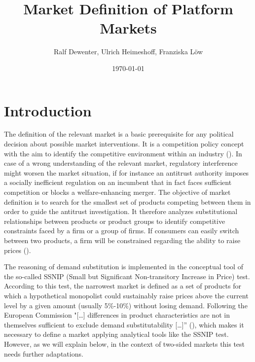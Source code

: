 \documentclass[12pt,a4paper]{scrreprt}
\begin{document}
\title{Market Definition of Platform Markets}
\date{\today}
\author{Ralf Dewenter, Ulrich Heimeshoff, Franziska Löw}

\maketitle






\chapter{Introduction}
The definition of the relevant market is a basic prerequisite for any political decision about possible market interventions. It is a competition policy concept with the aim to identify the competitive environment within an industry (\cite{argentesi_market_2005}). In case of a wrong understanding of the relevant market, regulatory interference might worsen the market situation, if for instance an antitrust authority imposes a socially inefficient regulation on an incumbent that in fact faces sufficient competition or blocks a welfare-enhancing merger. The objective of market definition is to search for the smallest set of products competing between them in order to guide the antitrust investigation. It therefore analyzes substitutional relationships between products or product groups to identify competitive constraints faced by a firm or a group of firms. If consumers can easily switch between two products, a firm will be constrained regarding the ability to raise prices (\cite{filistrucchi_market_2013}).

The reasoning of demand substitution is implemented in the conceptual tool of the so-called SSNIP (Small but Significant Non-transitory Increase in Price) test. According to this test, the narrowest market is defined as a set of products for which a hypothetical monopolist could sustainably raise prices above the current level by a given amount (usually 5\%-10\%) without losing demand. Following the European Commission "[…] differences in product characteristics are not in themselves sufficient to exclude demand substitutability […]” (\cite{european_commission_commission_1997}), which makes it necessary to define a market applying analytical tools like the SSNIP test. However, as we will explain below, in the context of two-sided markets this test needs further adaptations.
\end{document}

